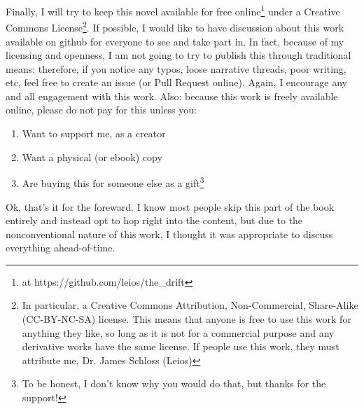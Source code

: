Finally, I will try to keep this novel available for free online\footnote{at https://github.com/leios/the\_drift} under a Creative Commons License\footnote{In particular, a Creative Commons Attribution, Non-Commercial, Share-Alike (CC-BY-NC-SA) license. This means that anyone is free to use this work for anything they like, so long as it is not for a commercial purpose and any derivative works have the same license. If people use this work, they must attribute me, Dr. James Schloss (Leios)}.
If possible, I would like to have discussion about this work available on github for everyone to see and take part in.
In fact, because of my licensing and openness, I am not going to try to publish this through traditional means; therefore, if you notice any typos, loose narrative threads, poor writing, etc, feel free to create an issue (or Pull Request online).
Again, I encourage any and all engagement with this work.
Also: because this work is freely available online, please do not pay for this unless you:
\begin{enumerate}
\item Want to support me, as a creator
\item Want a physical (or ebook) copy
\item Are buying this for someone else as a gift\footnote{To be honest, I don't know why you would do that, but thanks for the support!}
\end{enumerate}

Ok, that's it for the foreward.
I know most people skip this part of the book entirely and instead opt to hop right into the content, but due to the nonconventional nature of this work, I thought it was appropriate to discuss everything ahead-of-time.

